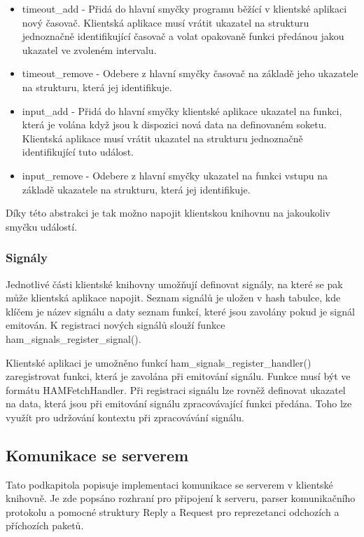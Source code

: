 \begin{itemize}
\item timeout\_add - Přidá do hlavní smyčky programu běžící v klientské aplikaci
nový časovač. Klientská aplikace
musí vrátit ukazatel na strukturu jednoznačně identifikující časovač a
volat opakovaně funkci předánou jakou ukazatel ve zvoleném intervalu.
\item timeout\_remove - Odebere z hlavní smyčky časovač na základě jeho ukazatele na strukturu, která jej identifikuje.
\item input\_add - Přidá do hlavní smyčky klientské aplikace ukazatel na funkci, která je volána když jsou k dispozici
nová data na definovaném soketu. Klientská aplikace
musí vrátit ukazatel na strukturu jednoznačně identifikující tuto událost.
\item input\_remove - Odebere z hlavní smyčky ukazatel na funkci vstupu na
základě ukazatele na strukturu, která jej identifikuje.
\end{itemize}

Díky této abstrakci je tak možno napojit klientskou knihovnu na jakoukoliv smyčku událostí.

\subsubsection{Signály}

Jednotlivé části klientské knihovny umožňují definovat signály, na které se pak může klientská aplikace napojit.
Seznam signálů je uložen v hash tabulce, kde klíčem je název signálu a daty seznam funkcí, které jsou zavolány
pokud je signál emitován. K registraci nových signálů slouží funkce ham\_signals\_register\_signal().

Klientské aplikaci je umožněno funkcí ham\_signals\_register\_handler() zaregistrovat funkci, která je zavolána
při emitování signálu. Funkce musí být ve formátu HAMFetchHandler. Při registraci signálu lze rovněž definovat
ukazatel na data, která jsou při emitování signálu zpracovávající funkci předána. Toho lze využít pro udržování
kontextu při zpracovávání signálu.


\subsection{Komunikace se serverem}

Tato podkapitola popisuje implementaci komunikace se serverem v klientské knihovně. Je zde popsáno rozhraní pro
připojení k serveru, parser komunikačního protokolu a pomocné struktury Reply a Request pro reprezetanci odchozích a
příchozích paketů.

